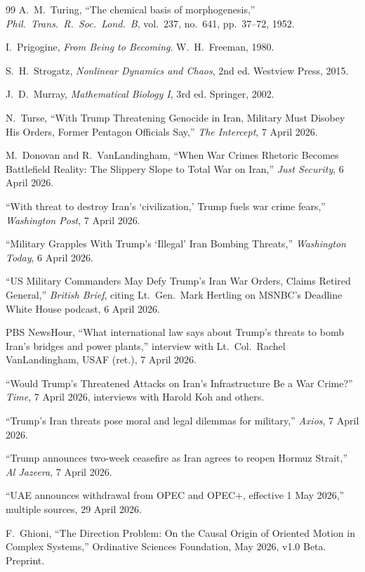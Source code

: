 \documentclass[12pt,a4paper]{article}
\begin{document}
\begin{thebibliography}{99}
A.~M.~Turing, ``The chemical basis of morphogenesis,'' \textit{Phil.~Trans.~R.~Soc.~Lond.~B}, vol.~237, no.~641, pp.~37--72, 1952.

I.~Prigogine, \textit{From Being to Becoming}. W.~H.~Freeman, 1980.

S.~H.~Strogatz, \textit{Nonlinear Dynamics and Chaos}, 2nd ed. Westview Press, 2015.

J.~D.~Murray, \textit{Mathematical Biology I}, 3rd ed. Springer, 2002.

N.~Turse, ``With Trump Threatening Genocide in Iran, Military Must Disobey His Orders, Former Pentagon Officials Say,'' \textit{The Intercept}, 7 April 2026.

M.~Donovan and R.~VanLandingham, ``When War Crimes Rhetoric Becomes Battlefield Reality: The Slippery Slope to Total War on Iran,'' \textit{Just Security}, 6 April 2026.

``With threat to destroy Iran's `civilization,' Trump fuels war crime fears,'' \textit{Washington Post}, 7 April 2026.

``Military Grapples With Trump's `Illegal' Iran Bombing Threats,'' \textit{Washington Today}, 6 April 2026.

``US Military Commanders May Defy Trump's Iran War Orders, Claims Retired General,'' \textit{British Brief}, citing Lt.~Gen.~Mark Hertling on MSNBC's Deadline White House podcast, 6 April 2026.

PBS NewsHour, ``What international law says about Trump's threats to bomb Iran's bridges and power plants,'' interview with Lt.~Col.~Rachel VanLandingham, USAF (ret.), 7 April 2026.

``Would Trump's Threatened Attacks on Iran's Infrastructure Be a War Crime?'' \textit{Time}, 7 April 2026, interviews with Harold Koh and others.

``Trump's Iran threats pose moral and legal dilemmas for military,'' \textit{Axios}, 7 April 2026.

``Trump announces two-week ceasefire as Iran agrees to reopen Hormuz Strait,'' \textit{Al Jazeera}, 7 April 2026.

``UAE announces withdrawal from OPEC and OPEC+, effective 1 May 2026,'' multiple sources, 29 April 2026.

F.~Ghioni, ``The Direction Problem: On the Causal Origin of Oriented Motion in Complex Systems,'' Ordinative Sciences Foundation, May 2026, v1.0 Beta. Preprint.

\end{thebibliography}
\end{document}
